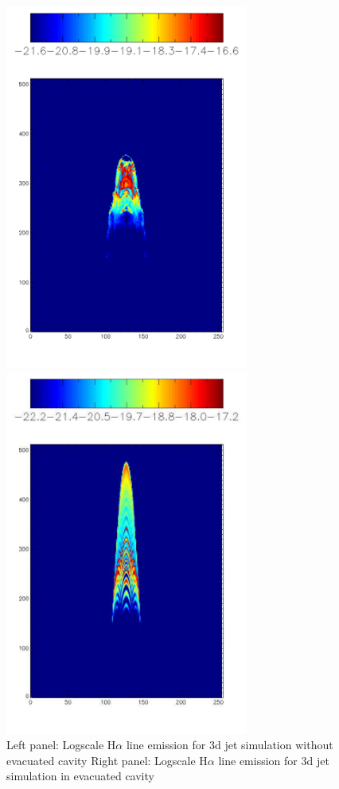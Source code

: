 \begin{figure}[t]
\begin{center}
\begin{minipage}[t]{.48\linewidth}
\includegraphics[width=8cm]{3dnograd}
\end{minipage} \hfill
\begin{minipage}[t]{.48\linewidth}
\includegraphics[width=8cm]{3dgrad}
\end{minipage}
\caption{ 
Left panel: Logscale H$\alpha$ line emission for 3d jet simulation without evacuated cavity 
Right panel: Logscale H$\alpha$ line emission for 3d jet simulation in evacuated cavity 
}
\label{fig:3DEmission}       %
\end{center}
\end{figure}


